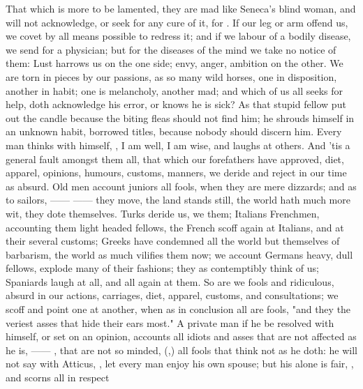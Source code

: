 That which is more to be lamented, they are mad like Seneca's blind woman, and
will not acknowledge, or seek for any cure of it, for
. If our leg or arm offend us, we
covet by all means possible to redress it; and if we labour
of a bodily disease, we send for a physician; but for the diseases of the mind
we take no notice of them: Lust harrows us on the one side;
envy, anger, ambition on the other. We are torn in pieces by our passions, as
so many wild horses, one in disposition, another in habit; one is melancholy,
another mad; and which of us all seeks for help, doth
acknowledge his error, or knows he is sick? As that stupid fellow put out the
candle because the biting fleas should not find him; he shrouds himself in an
unknown habit, borrowed titles, because nobody should discern him. Every man
thinks with himself, , I am well, I am wise, and
laughs at others. And 'tis a general fault amongst them all, that
which our forefathers have approved, diet, apparel,
opinions, humours, customs, manners, we deride and reject in our time as
absurd. Old men account juniors all fools, when they are mere dizzards; and as
to sailors, ------  ------ they move, the land
stands still, the world hath much more wit, they dote themselves. Turks deride
us, we them; Italians Frenchmen, accounting them light headed fellows, the
French scoff again at Italians, and at their several customs; Greeks have
condemned all the world but themselves of barbarism, the world as much vilifies
them now; we account Germans heavy, dull fellows, explode many of their
fashions; they as contemptibly think of us; Spaniards laugh at all, and all
again at them. So are we fools and ridiculous, absurd in our actions,
carriages, diet, apparel, customs, and consultations; we
scoff and point one at another, when as in conclusion all
are fools, "and they the veriest asses that hide their ears
most." A private man if he be resolved with himself, or set on an opinion,
accounts all idiots and asses that are not affected as he is,
------ , that
are not so minded, (,) all fools that think not as he doth: he will not say with
Atticus, , let every man enjoy his own
spouse; but his alone is fair, , \etc{} and scorns all in respect
